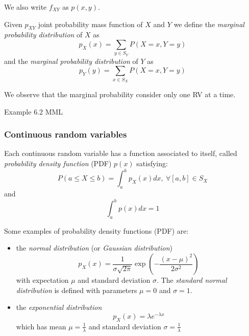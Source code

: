 We also write $f_{XY}$ as $p(x,y)$.
\begin{definition}
    Given $p_{XY}$ joint probability mass function of $X$ and $Y$ we define the \textit{marginal probability distribution} of $X$ as
    $$ p_X(x) = \sum_{y \in S_Y}{P(X = x, Y = y)} $$
    and the \textit{marginal probability distribution} of $Y$ as
    $$ p_Y(y) = \sum_{x \in S_X}{P(X = x, Y = y)} $$
\end{definition}

We observe that the marginal probability consider only one RV at a time.

Example 6.2 MML

\subsubsection{Continuous random variables}

Each continuous random variable has a function associated to itself, called \textit{probability density function} (PDF) $p(x)$ satisfying:
$$ P(a \leq X \leq b) = \int_{a}^{b}{p_X(x)dx},\ \forall[a, b] \in S_X $$
and 
$$\int_a^b p(x)dx=1$$




Some examples of probability density functions (PDF) are:

\begin{itemize}
    \item the \textit{normal distribution} (or \textit{Gaussian distribution})
    $$ p_X(x) = \frac{1}{\sigma\sqrt{2\pi}}\exp{\left(-\frac{(x-\mu)^2}{2\sigma^2}\right)} $$
    with expectation $\mu$ and standard deviation $\sigma$. The \textit{standard normal distribution} is defined with parameters $\mu = 0$ and $\sigma = 1$.
    \item the \textit{exponential distribution}
    $$ p_X(x) = \lambda e^{-\lambda x} $$
    which has mean $\mu = \frac{1}{\lambda}$ and standard deviation $\sigma = \frac{1}{\lambda}$
\end{itemize}


